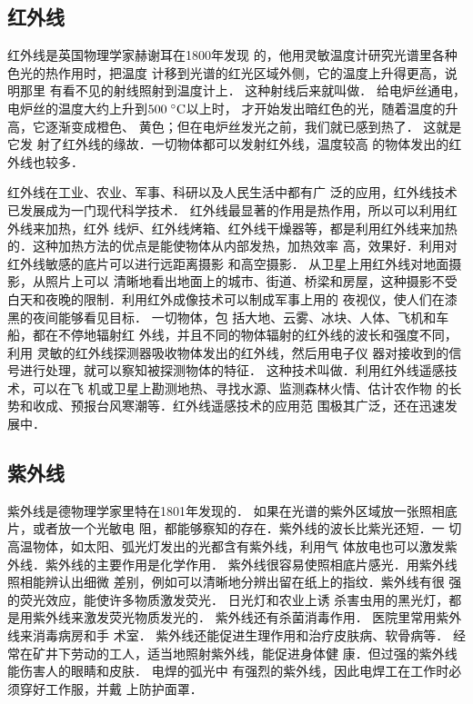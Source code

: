 \subsection{红外线}

红外线是英国物理学家赫谢耳在1800年发现
的，他用灵敏温度计研究光谱里各种色光的热作用时，把温度
计移到光谱的红光区域外侧，它的温度上升得更高，说明那里
有看不见的射线照射到温度计上．
这种射线后来就叫做．
给电炉丝通电，电炉丝的温度大约上升到$500\;{}^\circ\text{C}$以上时，
才开始发出暗红色的光，随着温度的升高，它逐渐变成橙色、
黄色；但在电炉丝发光之前，我们就已感到热了．
这就是它发
射了红外线的缘故．一切物体都可以发射红外线，温度较高
的物体发出的红外线也较多．

红外线在工业、农业、军事、科研以及人民生活中都有广
泛的应用，红外线技术已发展成为一门现代科学技术．
红外线最显著的作用是热作用，所以可以利用红外线来加热，红外
线炉、红外线烤箱、红外线干燥器等，都是利用红外线来加热
的．这种加热方法的优点是能使物体从内部发热，加热效率
高，效果好．利用对红外线敏感的底片可以进行远距离摄影
和高空摄影．
从卫星上用红外线对地面摄影，从照片上可以
清晰地看出地面上的城市、街道、桥梁和房屋，这种摄影不受
白天和夜晚的限制．利用红外成像技术可以制成军事上用的
夜视仪，使人们在漆黑的夜间能够看见目标．
一切物体，包
括大地、云雾、冰块、人体、飞机和车船，都在不停地辐射红
外线，并且不同的物体辐射的红外线的波长和强度不同，利用
灵敏的红外线探测器吸收物体发出的红外线，然后用电子仪
器对接收到的信号进行处理，就可以察知被探测物体的特征．
这种技术叫做．利用红外线遥感技术，可以在飞
机或卫星上勘测地热、寻找水源、监测森林火情、估计农作物
的长势和收成、预报台风寒潮等．红外线遥感技术的应用范
围极其广泛，还在迅速发展中．

\subsection{紫外线}

紫外线是德物理学家里特在1801年发现的．
如果在光谱的紫外区域放一张照相底片，或者放一个光敏电
阻，都能够察知的存在．紫外线的波长比紫光还短．一
切高温物体，如太阳、弧光灯发出的光都含有紫外线，利用气
体放电也可以激发紫外线．紫外线的主要作用是化学作用．
紫外线很容易使照相底片感光．用紫外线照相能辨认出细微
差别，例如可以清晰地分辨出留在纸上的指纹．紫外线有很
强的荧光效应，能使许多物质激发荧光．
日光灯和农业上诱
杀害虫用的黑光灯，都是用紫外线来激发荧光物质发光的．
紫外线还有杀菌消毒作用．
医院里常用紫外线来消毒病房和手
术室．
紫外线还能促进生理作用和治疗皮肤病、软骨病等．
经常在矿井下劳动的工人，适当地照射紫外线，能促进身体健
康．但过强的紫外线能伤害人的眼睛和皮肤．
电焊的弧光中
有强烈的紫外线，因此电焊工在工作时必须穿好工作服，并戴
上防护面罩．

